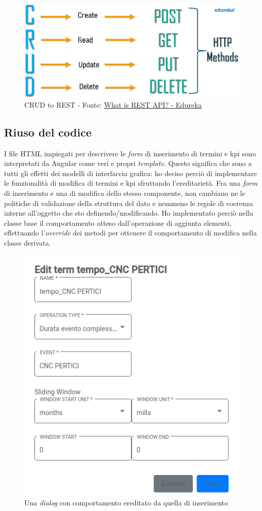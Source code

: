 \begin{figure}[H]
    \centering
    \includegraphics[width=0.90\columnwidth]{immagini/crudToRest.png}
    \caption{CRUD to REST - Fonte: \href{https://www.edureka.co/blog/what-is-rest-api/}{What is REST API? - Edureka}}
    \label{fig:crudToRest}
\end{figure}
\subsection{Riuso del codice}
I file HTML impiegati per descrivere le \textit{form} di inserimento di termini e \acrshort{kpi} sono interpretati da Angular come veri e propri \textit{template}. Questo significa che sono a tutti gli effetti dei modelli di interfaccia grafica: ho deciso perciò di implementare le funzionalità di modifica di termini e \acrshort{kpi} sfruttando l'ereditarietà. Fra una \textit{form} di inserimento e una di modifica dello stesso componente, non cambiano ne le politiche di validazione della struttura del dato e nemmeno le regole di coerenza interne all'oggetto che sto definendo/modificando. Ho implementato perciò nella classe base il comportamento atteso dall'operazione di aggiunta elementi, effettuando l'\textit{override} dei metodi per ottenere il comportamento di modifica nella classe derivata.

\begin{figure}[H]
    \centering
    \includegraphics[width=0.60\columnwidth]{immagini/term_editing.png}
    \caption{Una \textit{dialog} con comportamento ereditato da quella di inserimento}
    \label{fig:dialog}
\end{figure}
